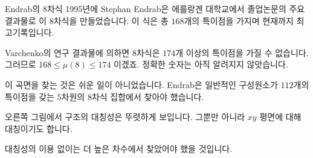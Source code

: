 \begin{surferPage}{Endrab의 $8$차식}
     1995년에 Stephan Endrab은 에를랑겐 대학교에서 졸업논문의 주요 결과물로 이 $8$차식을 만들었습니다. 이 식은 총 $168$개의 특이점을 가지며 현재까지 최고기록입니다.

    Varchenko의 연구 결과물에 의하면 $8$차식은 $174$개 이상의 특이점을 가질 수 없습니다. 그러므로 $168 \le \mu(8) \le 174$ 이겠죠. 정확한 숫자는 아직 알려지지 않앗습니다.

    이 곡면을 찾는 것은 쉬운 일이 아니었습니다. Endrab은 일반적인 구성원소가 $112$개의 특이점을 갖는 $5$차원의 $8$차식 집합에서 찾아야 했습니다. 
 

    오른쪽 그림에서 구조의 대칭성은 뚜렷하게 보입니다. 그뿐만 아니라 $xy$ 평면에 대해 대칭이기도 합니다. 

    대칭성의 이용 없이는 더 높은 차수에서 찾았어야 했을 것입니다.
\end{surferPage}
